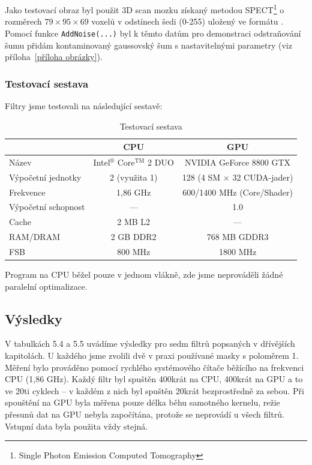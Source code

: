         Jako testovací obraz byl použit 3D scan mozku získaný metodou SPECT\footnote{Single Photon Emission Computed Tomography} o rozměrech $79 \times 95 \times 69$ voxelů v odstínech šedi (0-255) uložený ve formátu \Analyze. Pomocí funkce {\tt AddNoise(...)} byl k těmto datům pro demonstraci odstraňování šumu přidám kontaminovaný gaussovský šum s nastavitelnými parametry (viz příloha~\ref{příloha obrázky}).

    \subsubsection{Testovací sestava}

    Filtry jsme testovali na následující sestavě:

    \begin{table}[h]
    \begin{center}
    \begin{tabular}{lcc}
      \toprule
      & CPU & GPU \\
      \midrule
      Název & Intel$^\circledR$ Core$^\mathrm{TM}$ 2 DUO & NVIDIA GeForce 8800 GTX \\
      Výpočetní jednotky & 2 (využita 1) & 128 (4 SM $\times$ 32 CUDA-jader) \\
      Frekvence & 1,86 GHz & 600/1400 MHz (Core/Shader)\\
      Výpočetní schopnost & --- & 1.0 \\
      Cache & 2 MB L2 & --- \\
      RAM/DRAM & 2 GB DDR2 & 768 MB GDDR3 \\
      FSB & 800 MHz & 1800 MHz \\
      \bottomrule
    \end{tabular}
    \caption{Testovací sestava}
    \end{center}
\end{table}

    Program na CPU běžel pouze v jednom vlákně, zde jsme neprováděli žádné paralelní optimalizace.

    \subsection{Výsledky}

    V tabulkách 5.4 a 5.5 uvádíme výsledky pro sedm filtrů popsaných v dřívějších kapitolách. U každého jsme zvolili dvě v praxi používané masky s poloměrem 1. Měření bylo prováděno pomocí rychlého systémového čítače běžícího na frekvenci CPU (1,86 GHz). Každý filtr byl spuštěn 400krát na CPU, 400krát na GPU a to ve 20ti cyklech -- v každém z nich byl spuštěn 20krát bezprostředně za sebou. Při spouštění na GPU byla měřena pouze délka běhu samotného kernelu, režie přesunů dat na GPU nebyla započítána, protože se neprovádí u všech filtrů. Vstupní data byla použita vždy stejná.

